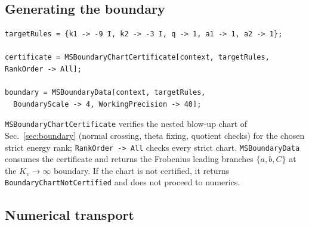 \documentclass[11pt,a4paper]{article}
\begin{document}
\subsection{Generating the boundary}

\begin{verbatim}
targetRules = {k1 -> -9 I, k2 -> -3 I, q -> 1, a1 -> 1, a2 -> 1};

certificate = MSBoundaryChartCertificate[context, targetRules, RankOrder -> All];

boundary = MSBoundaryData[context, targetRules,
  BoundaryScale -> 4, WorkingPrecision -> 40];
\end{verbatim}
\texttt{MSBoundaryChartCertificate} verifies the nested blow-up chart of Sec.~\ref{sec:boundary}
(normal crossing, theta fixing, quotient checks) for the chosen strict energy rank;
\texttt{RankOrder -> All} checks every strict chart. \texttt{MSBoundaryData} consumes the
certificate and returns the Frobenius leading branches $\{a,b,C\}$ at the $K_v\to\infty$ boundary.
If the chart is not certified, it returns \texttt{BoundaryChartNotCertified} and does not proceed
to numerics.

\subsection{Numerical transport}
\end{document}
